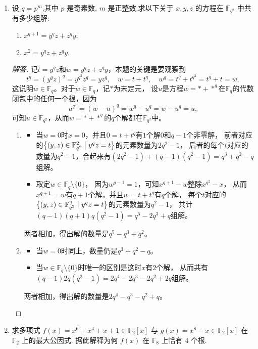 \begin{enumerate}
\begin{proof}
    由于$[K \cap L:F]$整除$n=[K:F]$和$m=[L:F]$，得到$[K \cap L:F]$整除$\operatorname{gcd}(n,m)$；
    并且，$F$的$\operatorname{gcd}(n,m)$次扩张是$K$和$L$的子域，那么也是$K \cap L$的子域，
    从而$\operatorname{gcd}(n,m)$整除$[K \cap L:F]$，因此$[K \cap L:F]=\operatorname{gcd}(n,m)$。
\end{proof}
\item 设 $q = p^m$,其中 $p$ 是奇素数, $m$ 是正整数.求以下关于 $x, y, z$ 的方程在 $\mathbb{F}_{q^2}$ 中共有多少组解:
\begin{enumerate}[label=(\arabic*)]
    \item $x^{q+1} = y^qz + z^qy$;
    \item $x^2 = y^qz + z^qy$.
\end{enumerate}
\begin{proof}[解答]
记$t=y^qz$和$w=y^qz+z^qy$，本题的关键是要观察到
\[t^q=(y^qz)^q=y^{q^2}z^q=yz^q,\quad w=t+t^q, \quad w^q=t^q+t^{q^2}=t^q+t=w,\]
这说明$w\in\mathbb{F}_q$。对于$w\in\mathbb{F}_q$，记$*$为未定元，
设$u$是方程$w=*+*^q$在$\mathbb{F}_q$的代数闭包中的任何一个根，因为
\[u^{q^2}=(w-u)^q=w^q-u^q=w-u^q=u,\]
可知$u\in\mathbb{F}_{q^2}$，从而$w=*+*^q$的$q$个解都在$\mathbb{F}_{q^2}$中。
\begin{enumerate}[label=(\arabic*)]
\item \begin{itemize}
    \item 当$w=0$时$x=0$，并且$0=t+t^q$有$1$个解$0$和$q-1$个非零解，
    前者对应的$\big\{(y,z)\in\mathbb{F}_{q^2}^2 \bigm| y^qz=t\big\}$的元素数量为$2q^2-1$，
    后者的每个$t$对应的数量为$q^2-1$，合起来有$(2q^2-1)+(q-1)(q^2-1)=q^3+q^2-q$组解。
    \item 取定$w\in\mathbb{F}_q\setminus\{0\}$，
    因为$w^{q-1}=1$，可知$x^{q+1}-w$整除$x^{q^2}-x$，
    从而$x^{q+1}=w$有$q+1$个解，并且$w=t+t^q$有$q$个解，
    每个$t$对应的$\big\{(y,z)\in\mathbb{F}_{q^2}^2 \bigm| y^qz=t\big\}$的元素数量为$q^2-1$，
    共计$(q-1)(q+1)q(q^2-1)=q^5-2q^3+q$组解。
\end{itemize}
两者相加，得出解的数量是$q^5-q^3+q^2$。
\item \begin{itemize}
    \item 当$w=0$时同上，数量仍是$q^3+q^2-q$。
    \item 当$w\in\mathbb{F}_q\setminus\{0\}$时唯一的区别是这时$x$有$2$个解，
    从而共有$(q-1)2q(q^2-1)=2q^4-2q^3-2q^2+2q$组解。
\end{itemize}
两者相加，得出解的数量是$2q^4-q^3-q^2+q$。\qedhere
\end{enumerate}
\end{proof}
\item 求多项式 $f(x) = x^6 + x^4 + x + 1 \in \mathbb{F}_2[x]$ 
与 $g(x) = x^8 - x \in \mathbb{F}_2[x]$ 在 $\mathbb{F}_2$ 上的最大公因式.
据此解释为何 $f(x)$ 在 $\mathbb{F}_8$ 上恰有 $4$ 个根.


\end{enumerate}
